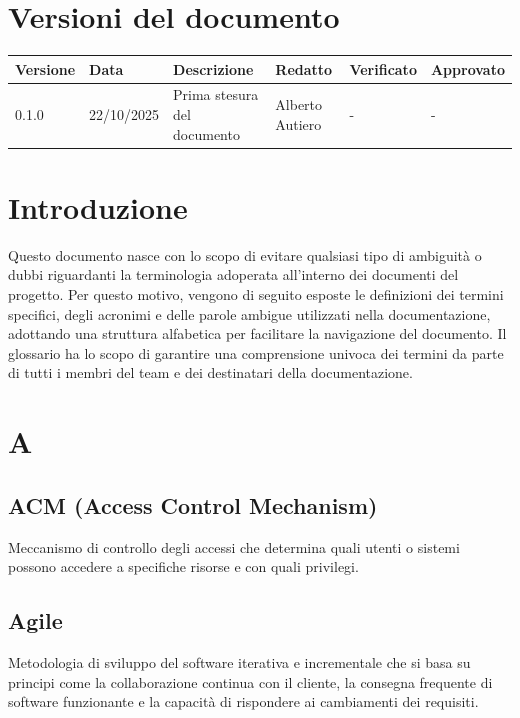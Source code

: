 \documentclass[a4paper,11pt]{article}
\begin{document}
\newpage

\tableofcontents

\newpage

\section{Versioni del documento}

{\footnotesize
\begin{tabular}{|p{1.5cm}|p{1.8cm}|p{4cm}|p{2cm}|p{2cm}|p{2cm}|}
\hline
\textbf{Versione} & \textbf{Data} & \textbf{Descrizione} & \textbf{Redatto} & \textbf{Verificato} & \textbf{Approvato} \\
\hline
0.1.0 & 22/10/2025 & Prima stesura del documento & Alberto Autiero & - & - \\
\hline
\end{tabular}
}

\newpage

\section{Introduzione}
Questo documento nasce con lo scopo di evitare qualsiasi tipo di ambiguità o dubbi riguardanti la terminologia adoperata all'interno dei documenti del progetto. Per questo motivo, vengono di seguito esposte le definizioni dei termini specifici, degli acronimi e delle parole ambigue utilizzati nella documentazione, adottando una struttura alfabetica per facilitare la navigazione del documento. Il glossario ha lo scopo di garantire una comprensione univoca dei termini da parte di tutti i membri del team e dei destinatari della documentazione.

\newpage

\section{A}

\subsection{ACM (Access Control Mechanism)}
Meccanismo di controllo degli accessi che determina quali utenti o sistemi possono accedere a specifiche risorse e con quali privilegi.

\subsection{Agile}
Metodologia di sviluppo del software iterativa e incrementale che si basa su principi come la collaborazione continua con il cliente, la consegna frequente di software funzionante e la capacità di rispondere ai cambiamenti dei requisiti.
\end{document}
